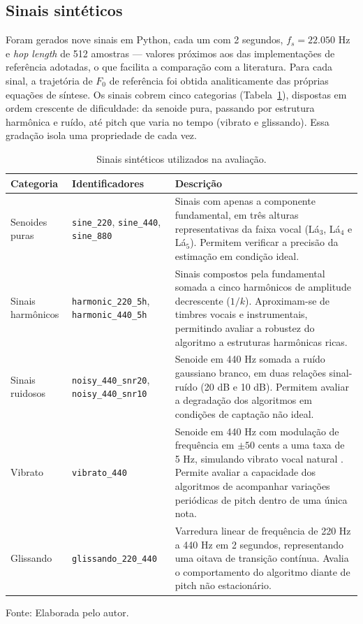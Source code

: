 \subsection{Sinais sintéticos}
Foram gerados nove sinais em Python, cada um com 2 segundos, $f_s = 22{.}050$ Hz e \textit{hop length} de 512 amostras --- valores próximos aos das implementações de referência adotadas, o que facilita a comparação com a literatura. Para cada sinal, a trajetória de $F_0$ de referência foi obtida analiticamente das próprias equações de síntese. Os sinais cobrem cinco categorias (Tabela~\ref{tab:sinteticos}), dispostas em ordem crescente de dificuldade: da senoide pura, passando por estrutura harmônica e ruído, até pitch que varia no tempo (vibrato e glissando). Essa gradação isola uma propriedade de cada vez.

\begin{table}[H]
\centering
\caption{\label{tab:sinteticos}Sinais sintéticos utilizados na avaliação.}
\small
\begin{tabular}{|p{3.6cm}|p{3.0cm}|p{7.5cm}|}
\hline
\textbf{Categoria} & \textbf{Identificadores} & \textbf{Descrição} \\
\hline
Senoides puras &
\texttt{sine\_220}, \texttt{sine\_440}, \texttt{sine\_880} &
Sinais com apenas a componente fundamental, em três alturas representativas
da faixa vocal (Lá$_3$, Lá$_4$ e Lá$_5$). Permitem verificar a precisão da
estimação em condição ideal. \\
\hline
Sinais harmônicos &
\texttt{harmonic\_220\_5h}, \texttt{harmonic\_440\_5h} &
Sinais compostos pela fundamental somada a cinco harmônicos de amplitude
decrescente ($1/k$). Aproximam-se de timbres vocais e instrumentais,
permitindo avaliar a robustez do algoritmo a estruturas harmônicas
ricas. \\
\hline
Sinais ruidosos &
\texttt{noisy\_440\_snr20}, \texttt{noisy\_440\_snr10} &
Senoide em 440 Hz somada a ruído gaussiano branco, em duas relações
sinal-ruído (20 dB e 10 dB). Permitem avaliar a degradação dos algoritmos
em condições de captação não ideal. \\
\hline
Vibrato &
\texttt{vibrato\_440} &
Senoide em 440 Hz com modulação de frequência em $\pm 50$ cents a uma taxa
de 5 Hz, simulando vibrato vocal natural \cite{sundberg1987science,prame1994vibrato}. Permite avaliar a capacidade dos
algoritmos de acompanhar variações periódicas de pitch dentro de uma única
nota. \\
\hline
Glissando &
\texttt{glissando\_220\_440} &
Varredura linear de frequência de 220 Hz a 440 Hz em 2 segundos,
representando uma oitava de transição contínua. Avalia o comportamento do
algoritmo diante de pitch não estacionário. \\
\hline
\end{tabular}
\small Fonte: Elaborada pelo autor.
\end{table}

